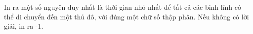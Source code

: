 In ra một số nguyên duy nhất là thời gian nhỏ nhất để tất cả các binh lính có thể di chuyển đến một thủ đô, với đúng một chữ số thập phân. Nếu không có lời giải, in ra -1.